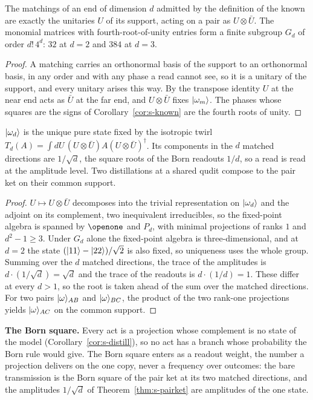 \begin{lemma}
\label{lem:s-matching}
The matchings of an end of dimension $d$ admitted by the definition of the known are exactly the unitaries $U$ of its support, acting on a pair as $U\otimes\bar{U}$. The monomial matrices with fourth-root-of-unity entries form a finite subgroup $G_{d}$ of order $d!\,4^{d}$: $32$ at $d=2$ and $384$ at $d=3$.
\end{lemma}
\begin{proof}
A matching carries an orthonormal basis of the support to an orthonormal basis, in any order and with any phase a read cannot see, so it is a unitary of the support, and every unitary arises this way. By the transpose identity $U$ at the near end acts as $\bar{U}$ at the far end, and $U\otimes\bar{U}$ fixes $|\omega_{m}\rangle$. The phases whose squares are the signs of Corollary~\ref{cor:s-known} are the fourth roots of unity.
\end{proof}

\begin{theorem}
\label{thm:s-pairket}
$|\omega_{d}\rangle$ is the unique pure state fixed by the isotropic twirl $T_{d}(A)=\int dU\,(U\otimes\bar{U})A(U\otimes\bar{U})^{\dagger}$. Its components in the $d$ matched directions are $1/\sqrt{d}$, the square roots of the Born readouts $1/d$, so a read is read at the amplitude level. Two distillations at a shared qudit compose to the pair ket on their common support.
\end{theorem}
\begin{proof}
$U\mapsto U\otimes\bar{U}$ decomposes into the trivial representation on $|\omega_{d}\rangle$ and the adjoint on its complement, two inequivalent irreducibles, so the fixed-point algebra is spanned by $\openone$ and $P_{d}$, with minimal projections of ranks $1$ and $d^{2}-1\geq 3$. Under $G_{d}$ alone the fixed-point algebra is three-dimensional, and at $d=2$ the state $(|11\rangle-|22\rangle)/\sqrt{2}$ is also fixed, so uniqueness uses the whole group. Summing over the $d$ matched directions, the trace of the amplitudes is $d\cdot(1/\sqrt{d})=\sqrt{d}$ and the trace of the readouts is $d\cdot(1/d)=1$. These differ at every $d>1$, so the root is taken ahead of the sum over the matched directions. For two pairs $|\omega\rangle_{AB}$ and $|\omega\rangle_{BC}$, the product of the two rank-one projections yields $|\omega\rangle_{AC}$ on the common support.
\end{proof}

\textbf{The Born square.} Every act is a projection whose complement is no state of the model (Corollary~\ref{cor:s-distill}), so no act has a branch whose probability the Born rule would give. The Born square enters as a readout weight, the number a projection delivers on the one copy, never a frequency over outcomes: the bare transmission is the Born square of the pair ket at its two matched directions, and the amplitudes $1/\sqrt{d}$ of Theorem~\ref{thm:s-pairket} are amplitudes of the one state.

